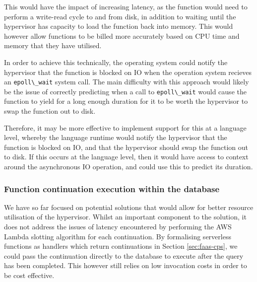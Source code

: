 This would have the impact of increasing latency, as the function would need to perform a write-read cycle to and from disk, in addition to waiting until the hypervisor has capacity to load the function back into memory. This would however allow functions to be billed more accurately based on CPU time and memory that they have utilised.


In order to achieve this technically, the operating system could notify the hypervisor that the function is blocked on IO when the operation system recieves an \verb|epoll\_wait| system call. The main difficulty with this approach would likely be the issue of correctly predicting when a call to \verb|epoll\_wait| would cause the function to yield for a long enough duration for it to be worth the hypervisor to swap the function out to disk.

Therefore, it may be more effective to implement support for this at a language level, whereby the language runtime would notify the hypervisor that the function is blocked on IO, and that the hypervisor should swap the function out to disk. If this occurs at the language level, then it would have access to context around the asynchronous IO operation, and could use this to predict its duration.

\subsubsection{Function continuation execution within the database}
We have so far focused on potential solutions that would allow for better resource utilisation of the hypervisor. Whilst an important component to the solution, it does not address the issues of latency encountered by performing the AWS Lambda slotting algorithm for each continuation. By formalising serverless functions as handlers which return continuations in Section \ref{sec:faas-cps}, we could pass the continuation directly to the database to execute after the query has been completed. This however still relies on low invocation costs in order to be cost effective.

